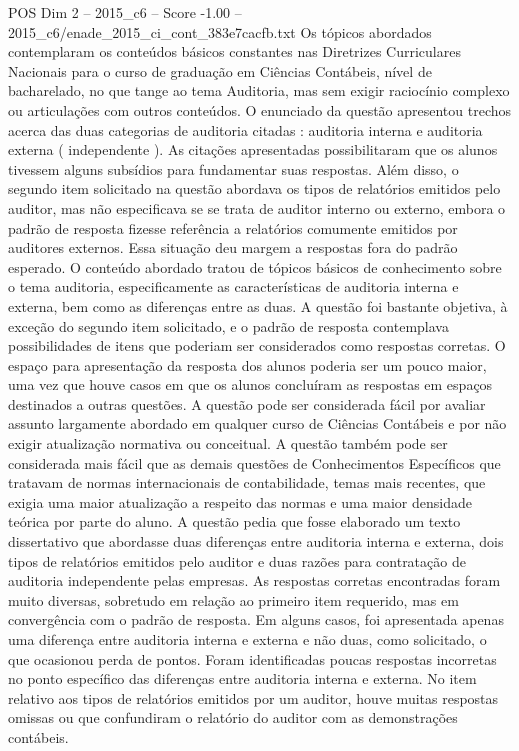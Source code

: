 \begin{textsample}{POS Dim 2 – 2015\_c6 – Score -1.00 – 2015\_c6/enade\_2015\_ci\_cont\_383e7cacfb.txt}
Os tópicos abordados contemplaram os conteúdos básicos constantes nas Diretrizes Curriculares Nacionais para o curso de graduação em Ciências Contábeis, nível de bacharelado, no que tange ao tema Auditoria, mas sem exigir raciocínio complexo ou articulações com outros conteúdos.
O enunciado da questão apresentou trechos acerca das duas categorias de auditoria citadas : auditoria interna e auditoria externa ( independente ).
As citações apresentadas possibilitaram que os alunos tivessem alguns subsídios para fundamentar suas respostas.
Além disso, o segundo item solicitado na questão abordava os tipos de relatórios emitidos pelo auditor, mas não especificava se se trata de auditor interno ou externo, embora o padrão de resposta fizesse referência a relatórios comumente emitidos por auditores externos.
Essa situação deu margem a respostas fora do padrão esperado.
O conteúdo abordado tratou de tópicos básicos de conhecimento sobre o tema auditoria, especificamente as características de auditoria interna e externa, bem como as diferenças entre as duas.
A questão foi bastante objetiva, à exceção do segundo item solicitado, e o padrão de resposta contemplava possibilidades de itens que poderiam ser considerados como respostas corretas.
O espaço para apresentação da resposta dos alunos poderia ser um pouco maior, uma vez que houve casos em que os alunos concluíram as respostas em espaços destinados a outras questões.
A questão pode ser considerada fácil por avaliar assunto largamente abordado em qualquer curso de Ciências Contábeis e por não exigir atualização normativa ou conceitual.
A questão também pode ser considerada mais fácil que as demais questões de Conhecimentos Específicos que tratavam de normas internacionais de contabilidade, temas mais recentes, que exigia uma maior atualização a respeito das normas e uma maior densidade teórica por parte do aluno.
A questão pedia que fosse elaborado um texto dissertativo que abordasse duas diferenças entre auditoria interna e externa, dois tipos de relatórios emitidos pelo auditor e duas razões para contratação de auditoria independente pelas empresas.
As respostas corretas encontradas foram muito diversas, sobretudo em relação ao primeiro item requerido, mas em convergência com o padrão de resposta.
Em alguns casos, foi apresentada apenas uma diferença entre auditoria interna e externa e não duas, como solicitado, o que ocasionou perda de pontos.
Foram identificadas poucas respostas incorretas no ponto específico das diferenças entre auditoria interna e externa.
No item relativo aos tipos de relatórios emitidos por um auditor, houve muitas respostas omissas ou que confundiram o relatório do auditor com as demonstrações contábeis.

\end{textsample}
